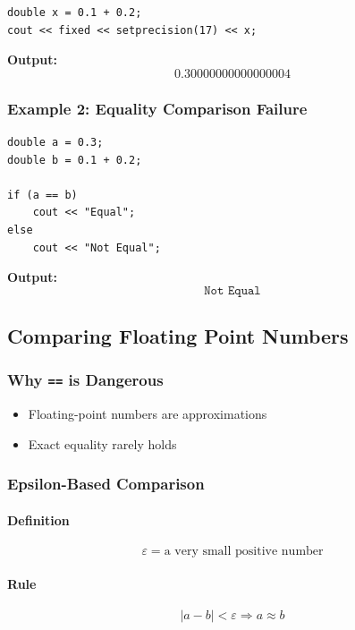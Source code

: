 \documentclass[11pt]{article}
\begin{document}
\begin{lstlisting}
double x = 0.1 + 0.2;
cout << fixed << setprecision(17) << x;
\end{lstlisting}

\textbf{Output:}
\[
0.30000000000000004
\]

\subsubsection{Example 2: Equality Comparison Failure}

\begin{lstlisting}
double a = 0.3;
double b = 0.1 + 0.2;

if (a == b)
    cout << "Equal";
else
    cout << "Not Equal";
\end{lstlisting}

\textbf{Output:}
\[
\texttt{Not Equal}
\]

\subsection{Comparing Floating Point Numbers}

\subsubsection{Why \texttt{==} is Dangerous}
\begin{itemize}
    \item Floating-point numbers are approximations
    \item Exact equality rarely holds
\end{itemize}

\subsubsection{Epsilon-Based Comparison}

\paragraph{Definition}
\[
\varepsilon = \text{a very small positive number}
\]

\paragraph{Rule}
\[
|a - b| < \varepsilon \Rightarrow a \approx b
\]
\end{document}
